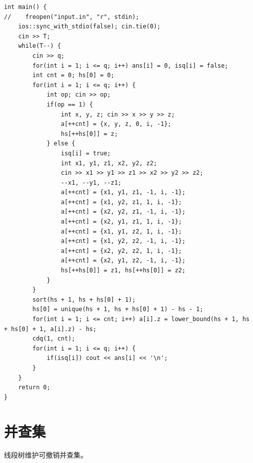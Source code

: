\documentclass[a4paper,11pt,twoside,fontset = fandol,UTF8]{ctexbook} %
\begin{document}
\begin{lstlisting}
int main() {
//    freopen("input.in", "r", stdin);
    ios::sync_with_stdio(false); cin.tie(0);
    cin >> T;
    while(T--) {
        cin >> q;
        for(int i = 1; i <= q; i++) ans[i] = 0, isq[i] = false;
        int cnt = 0; hs[0] = 0;
        for(int i = 1; i <= q; i++) {
            int op; cin >> op;
            if(op == 1) {
                int x, y, z; cin >> x >> y >> z;
                a[++cnt] = {x, y, z, 0, i, -1};
                hs[++hs[0]] = z;
            } else {
                isq[i] = true;
                int x1, y1, z1, x2, y2, z2;
                cin >> x1 >> y1 >> z1 >> x2 >> y2 >> z2;
                --x1, --y1, --z1;
                a[++cnt] = {x1, y1, z1, -1, i, -1};
                a[++cnt] = {x1, y2, z1, 1, i, -1};
                a[++cnt] = {x2, y2, z1, -1, i, -1};
                a[++cnt] = {x2, y1, z1, 1, i, -1};
                a[++cnt] = {x1, y1, z2, 1, i, -1};
                a[++cnt] = {x1, y2, z2, -1, i, -1};
                a[++cnt] = {x2, y2, z2, 1, i, -1};
                a[++cnt] = {x2, y1, z2, -1, i, -1};
                hs[++hs[0]] = z1, hs[++hs[0]] = z2;
            }
        }
        sort(hs + 1, hs + hs[0] + 1);
        hs[0] = unique(hs + 1, hs + hs[0] + 1) - hs - 1;
        for(int i = 1; i <= cnt; i++) a[i].z = lower_bound(hs + 1, hs + hs[0] + 1, a[i].z) - hs;
        cdq(1, cnt);
        for(int i = 1; i <= q; i++) {
            if(isq[i]) cout << ans[i] << '\n';
        }
    }
    return 0;
}
	\end{lstlisting}
	\section{并查集}
	线段树维护可撤销并查集。
	
\end{document}
